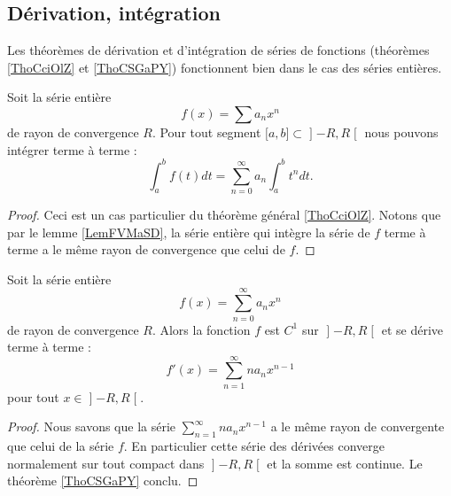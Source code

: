 \subsection{Dérivation, intégration}

Les théorèmes de dérivation et d'intégration de séries de fonctions (théorèmes \ref{ThoCciOlZ} et \ref{ThoCSGaPY}) fonctionnent bien dans le cas des séries entières.

\begin{proposition}
    Soit la série entière
    \begin{equation}
        f(x)=\sum a_nx^n
    \end{equation}
    de rayon de convergence \( R\). Pour tout segment \( \mathopen[ a , b \mathclose]\subset\mathopen] -R , R \mathclose[\) nous pouvons intégrer terme à terme :
    \begin{equation}
        \int_a^bf(t)dt=\sum_{n=0}^{\infty}a_n\int_a^bt^ndt.
    \end{equation}
\end{proposition}

\begin{proof}
    Ceci est un cas particulier du théorème général \ref{ThoCciOlZ}. Notons que par le lemme \ref{LemFVMaSD}, la série entière qui intègre la série de \( f\) terme à terme a le même rayon de convergence que celui de \( f\).
\end{proof}

\begin{proposition}     \label{ProptzOIuG}
    Soit la série entière
    \begin{equation}
        f(x)=\sum_{n=0}^{\infty}a_n x^n
    \end{equation}
    de rayon de convergence \( R\). Alors la fonction \( f\) est \( C^1\) sur \( \mathopen] -R , R \mathclose[\) et se dérive terme à terme :
    \begin{equation}
        f'(x)=\sum_{n=1}^{\infty}na_nx^{n-1}
    \end{equation}
    pour tout \( x\in\mathopen] -R , R \mathclose[\).
\end{proposition}

\begin{proof}
    Nous savons que la série \( \sum_{n=1}^{\infty}na_nx^{n-1}\) a le même rayon de convergente que celui de la série \( f\). En particulier cette série des dérivées converge normalement sur tout compact dans \( \mathopen] -R , R \mathclose[\) et la somme est continue. Le théorème \ref{ThoCSGaPY} conclu.
\end{proof}

